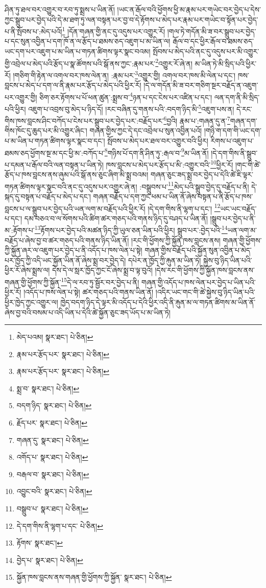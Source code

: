 ཤིན་ཏུ་ཐལ་བར་འགྱུར་བ་རབ་ཏུ་སྨྲས་པ་ཡིན་ནོ། །ཡང་ན་རྒོལ་བའི་ཕྱོགས་ཕྱི་མ་རྣམ་པར་གཡེང་བར་བྱེད་པ་དེས་ཀྱང་སྒྲུབ་པར་བྱེད་པའི་དེ་མ་ཐག་ཏུ་ལན་བསྟན་པར་བྱ་བ་དེ་རྟོགས་པ་མེད་པར་རྣམ་པར་གཡེང་བ་སྟོན་པར་བྱེད་པ་ནི་སྤོབས་པ་:མེད་པའོ།\footnote{མེད་པའམ།  སྣར་ཐང་།  པེ་ཅིན། } །དོན་གཞན་གྱི་ནང་དུ་འདུས་པར་འགྱུར་རོ། །གལ་ཏེ་གདོན་མི་ཟ་བར་སྒྲུབ་པར་བྱེད་པ་དང་སུན་འབྱིན་པ་དག་ཁོ་ན་ལ་རྩོད་པ་ཐམས་ཅད་འཇུག་པ་མ་ཡིན་ལ། རྒོལ་བ་དང་ཕྱིར་རྒོལ་བ་ཐམས་ཅད་ཡང་དག་པར་འཇུག་པ་མ་ཡིན་པ་གཏན་ཚིགས་ལྟར་སྣང་བའམ། སྤོབས་པ་མེད་པའི་ནང་དུ་འདུས་པར་མི་འགྱུར་གྱི་འབྲེལ་པ་མེད་པའི་རྩོད་པ་སྣ་ཚོགས་པའི་སྒོ་ནས་ཀྱང་:རྣམ་པར་\footnote{རྣམ་པར་རྩོད་པར་  སྣར་ཐང་།  པེ་ཅིན། }འགྱུར་རོ་ཞེ་ན། མ་ཡིན་ཏེ་མི་སྲིད་པའི་ཕྱིར་རོ། །གཅིག་གི་རྟེན་ལ་འགལ་བར་ཁས་ལེན་ན། :རྣམ་པར་\footnote{རྣམ་པར་རྩོད་པར་  སྣར་ཐང་།  པེ་ཅིན། }འགྱུར་གྱི། འགལ་བར་ཁས་མི་ལེན་པ་དང་། ཁས་བླངས་པ་མེད་པ་དག་ལ་ནི་རྣམ་པར་རྩོད་པ་མེད་པའི་ཕྱིར་རོ། །དེ་ལ་གདོན་མི་ཟ་བར་གཅིག་སྔར་བརྗོད་ན་འཇུག་པར་འགྱུར་གྱི། ཅིག་ཅར་རྟོགས་པ་པོ་ཕན་ཚུན་:སྨྲས་བ་\footnote{སྨྲ་བ་  སྣར་ཐང་།  པེ་ཅིན། }ཉན་པ་དང་ངེས་པར་འཛིན་པ་དང་། ལན་དག་ནི་མི་སྲིད་པའི་ཕྱིར། འཇུག་པ་འབྲས་བུ་མེད་པ་ཉིད་དོ། །རང་བཞིན་དུ་གནས་པའི་:བདག་ཉིད་མི་\footnote{བདག་ཉིད་  སྣར་ཐང་།  པེ་ཅིན། }འཇུག་པས་ན། དེ་རང་གིས་ཁས་བླངས་ཤིང་བཀོད་པ་ངེས་པར་སྒྲུབ་པར་བྱེད་པར་:བརྗོད་པར་\footnote{རྗོད་པར་  སྣར་ཐང་།  པེ་ཅིན། }བྱའི། རྣམ་པ་:གཞན་དུ་ན་\footnote{གཞན་དུ་  སྣར་ཐང་།  པེ་ཅིན། }གཞན་དག་གིས་ཁོང་དུ་ཆུད་པར་མི་འགྱུར་ཞིང་། གཞན་གྱིས་ཀྱང་དེ་དང་འབྲེལ་པ་སུན་འབྱིན་པའོ། །གཉི་ག་དག་གི་ཡང་དག་པ་མ་ཡིན་པ་གཏན་ཚིགས་ལྟར་སྣང་བ་དང་། སྤོབས་པ་མེད་པར་ཐལ་བར་འགྱུར་བའི་ཕྱིར། རིགས་པ་འཇུག་པ་ཐམས་ཅད་ཕྱོགས་སྔ་མ་དང་ཕྱི་མ་:བཀོད་པ་\footnote{འགོད་པ་  སྣར་ཐང་།  པེ་ཅིན། }གཉིས་པོ་དག་ནི་ཤིན་ཏུ་:རྒལ་བ་\footnote{བརྒལ་བ་  སྣར་ཐང་།  པེ་ཅིན། }མ་ཡིན་ནོ། །དེ་དག་གིས་ནི་སྒྲུབ་པ་དམན་པ་རྒོལ་བའི་ལན་བསྟན་པ་ཡིན་ཏེ། ཁས་བླངས་པ་མེད་པར་རྩོད་པ་མི་:འགྱུར་བའི་\footnote{འབྱུང་བའི་  སྣར་ཐང་།  པེ་ཅིན། }ཕྱིར་རོ། །གང་གི་ཚེ་རྩོད་པ་ཁས་བླངས་ནས་ཞུམ་པའི་སྒོ་ནས་ཅུང་ཞིག་མི་སྨྲ་བའམ། གཞན་ཅུང་ཟད་སྨྲ་བར་བྱེད་པ་དེའི་ཚེ་ཇི་ལྟར་གཏན་ཚིགས་ལྟར་སྣང་བའི་ནང་དུ་འདུས་པར་འགྱུར་ཞེ་ན། :བསྒྲུབས་པ་\footnote{བསྒྲུབ་པ་  སྣར་ཐང་།  པེ་ཅིན། }མེད་པའི་སྒྲུབ་བྱེད་དུ་བརྗོད་པ་ནི། དེ་སྐད་དུ་བསྟན་པ་བརྗོད་པ་མེད་པ་དང་། གཞན་བརྗོད་པ་དག་ཀྱང་ཕམ་པ་ཡིན་ནོ་ཞེས་བསྟན་པ་ནི་རྩོད་པ་ཁས་བླངས་པ་ལ་སྒྲུབ་པར་བྱེད་པའི་ཡན་ལག་མ་བརྗོད་པའི་ཕྱིར་རོ། །དེ་དག་གིས་ནི་ལྷག་པ་དང་། \footnote{དེ་དག་གིས་ནི་ལྷག་པ་དང་  པེ་ཅིན། }ཡང་ཡང་བརྗོད་པ་དང་། དམ་བཅའ་བ་ལ་སོགས་པའི་ཚིག་ཚར་གཅད་པའི་གནས་ཉིད་དུ་བཤད་པ་ཡིན་ནོ། །སྒྲུབ་པར་བྱེད་པ་ནི་མ་:རྟོགས་པ་\footnote{རྟོགས་  སྣར་ཐང་། }རྟོགས་པར་བྱེད་པའི་མཚན་ཉིད་ཀྱི་ཡུལ་ཅན་ཡིན་པའི་ཕྱིར། སྒྲུབ་པར་:བྱེད་པའི་\footnote{བྱེད་པ་  སྣར་ཐང་།  པེ་ཅིན། }ཡན་ལག་མ་བརྗོད་པ་ཞེས་བྱ་བ་ཚར་གཅད་པའི་གནས་ཉིད་ཡིན་ནོ། །རང་གི་ཕྱོགས་ཀྱི་སྐྱོན་ཁས་བླངས་ནས། གཞན་གྱི་ཕྱོགས་ཀྱི་སྐྱོན་ཞར་ལ་འཇུག་པར་བྱེད་པ་ནི་འདོད་པ་ཁས་ལེན་པ་སྟེ། གཞན་གྱིས་བརྗོད་པའི་སྐྱོན་སུན་འབྱིན་པ་མེད་པར་ཁྱོད་ཀྱི་འདི་ཡང་སྐྱོན་ཡིན་ནོ་ཞེས་སྨྲ་བར་བྱེད་དེ། དཔེར་ན་ཁྱོད་ཀྱི་རྐུན་མ་ཡིན་ཏེ། སྐྱེས་བུ་ཉིད་ཡིན་པའི་ཕྱིར་རོ་ཞེས་སྨྲས་ལ། དེས་དེ་ལ་སླར་ཁྱོད་ཀྱང་ངོ་ཞེས་སྨྲ་བ་ལྟ་བུའོ། །དེས་རང་གི་ཕྱོགས་ཀྱི་སྐྱོན་ཁས་བླངས་ནས་གཞན་གྱི་ཕྱོགས་ཀྱི་སྐྱོན་\footnote{སྐྱོན་ཁས་བླངས་ནས་གཞན་གྱི་ཕྱོགས་ཀྱི་སྐྱོན་  སྣར་ཐང་།  པེ་ཅིན། }དེ་ལ་རབ་ཏུ་སྦྱོར་བར་བྱེད་པ་ནི། གཞན་གྱི་འདོད་པ་ཁས་ལེན་པར་བྱེད་པ་ཡིན་པའི་ཕྱིར་རོ། །འདོད་པ་ཁས་ལེན་པ་སྟེ། ཚར་གཅད་པའི་གནས་ཡིན་ནོ། །འདིར་ཡང་གང་གི་ཚེ་སྐྱེས་བུ་ཉིད་ཡིན་པའི་ཕྱིར་ཁྱེད་ཀྱང་འགྱུར་ལ། ཁྱེད་བདག་ཉིད་དེ་ལྟར་མི་འདོད་པ་དེའི་ཕྱིར་འདི་ནི་རྐུན་མ་ལ་གཏན་ཚིགས་མ་ཡིན་ནོ་ཞེས་བྱ་བའི་བསམ་པ་འདི་ཡིན་པ་དེའི་ཚེ་སྐྱོན་ཅུང་ཟད་ཡོད་པ་མ་ཡིན་ཏེ། 